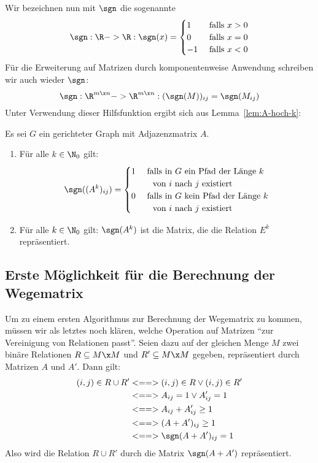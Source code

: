 Wir bezeichnen nun mit $\sgn$ die sogenannte
\[
\sgn: \R -> \R: \sgn(x) = 
\begin{cases}
  1 & \text{ falls } x>0 \\
  0 & \text{ falls } x=0 \\
  -1 & \text{ falls } x<0 \\
\end{cases}
\]
Für die Erweiterung auf Matrizen durch komponentenweise Anwendung
schreiben wir auch wieder $\sgn$:
\[
\sgn : \R^{m\x n} -> \R^{m\x n}: ( \sgn(M))_{ij} = \sgn(M_{ij})
\]
Unter Verwendung dieser Hilfsfunktion ergibt sich aus
Lemma~\ref{lem:A-hoch-k}:
\begin{korollar}
  \label{kor:sgn-A-hoch-k}
  Es sei $G$ ein gerichteter Graph mit Adjazenzmatrix $A$. 
  \begin{enumerate}
  \item Für alle $k\in\N_0$ gilt: 
    \[
    \sgn((A^k)_{ij})=
    \begin{cases}
      1 & \text{ falls in $G$ ein Pfad der Länge $k$} \\
        & \text{\quad von $i$ nach $j$ existiert}\\
      0 & \text{ falls in $G$ kein Pfad der Länge $k$} \\
        & \text{\quad von $i$ nach $j$ existiert}\\
    \end{cases}
    \]
  \item Für alle $k\in\N_0$ gilt: $\sgn(A^k)$ ist die Matrix, die die
    Relation $E^k$ repräsentiert. 
  \end{enumerate}
\end{korollar}
% 
\Tut\subsection{Erste M\"oglichkeit f\"ur die Berechnung der Wegematrix}
\label{subsub:wegematrix-1}

Um zu einem ersten Algorithmus zur Berechnung der Wegematrix zu
kommen, müssen wir als letztes noch klären, welche Operation auf
Matrizen "`zur Vereinigung von Relationen passt"'.  Seien dazu auf der
gleichen Menge $M$ zwei binäre Relationen $R\subseteq M\x M$ und
$R'\subseteq M\x M$ gegeben, repräsentiert durch Matrizen $A$ und
$A'$. Dann gilt:
%
\begin{align*}
   (i,j)\in R\cup R' 
   &<==> (i,j)\in R \lor (i,j) \in R'\\
   &<==> A_{ij} = 1 \lor A'_{ij} = 1 \\
   &<==> A_{ij} +A'_{ij} \geq 1 \\
   &<==> (A+A')_{ij} \geq 1 \\
   &<==> \sgn(A+A')_{ij} =1 
\end{align*}
%
Also wird die Relation $R\cup R'$ durch die Matrix $\sgn(A+A')$
repräsentiert.

